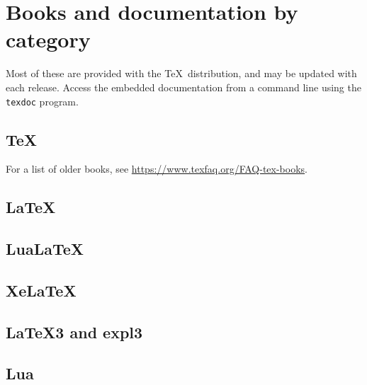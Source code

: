 \documentclass{article}
\newcommand*{\XeTeXrevE}
{\protect\hspace{-.1667em}\protect\raisebox{-.5ex}{\protect\reflectbox{E}}\protect\hspace{-.125em}}
\providecommand*{\XeLaTeX}{\mbox{X\XeTeXrevE\LaTeX}}
\def\pkg#1{#1}%
\def\TeX{TeX}%
\def\LaTeX{LaTeX}%
\def\XeLaTeX{XeLaTeX}%
\renewcommand*{\pkg}[1]{#1}
\renewcommand*{\XeLaTeX}{XeLaTeX}
\renewcommand*{\TeX}{TeX}
\renewcommand*{\LaTeX}{LaTeX}
\begin{document}
\printbibliography[
    heading=none,
    category=printedbooks,
]


\section{Books and documentation by category}

Most of these are provided with the \TeX\ distribution, and may be updated
with each release.
Access the embedded documentation from a command line using the \texttt{texdoc}
program.

\subsection{\TeX}

For a list of older books, see \url{https://www.texfaq.org/FAQ-tex-books}.

\printbibliography[
    heading=none,
    category=TeX,
]

\clearpage

\subsection{\LaTeX}

\printbibliography[
    heading=none,
    category=LaTeX,
]

\subsection{Lua\LaTeX}

\printbibliography[
    heading=none,
    category=LuaLaTeX,
]


\subsection{\XeLaTeX}

\printbibliography[
    heading=none,
    category=XeLaTeX,
]


\subsection{\LaTeX3 and \pkg{expl3}}

\printbibliography[
    heading=none,
    category=expl3,
]


\subsection{Lua}
\end{document}
